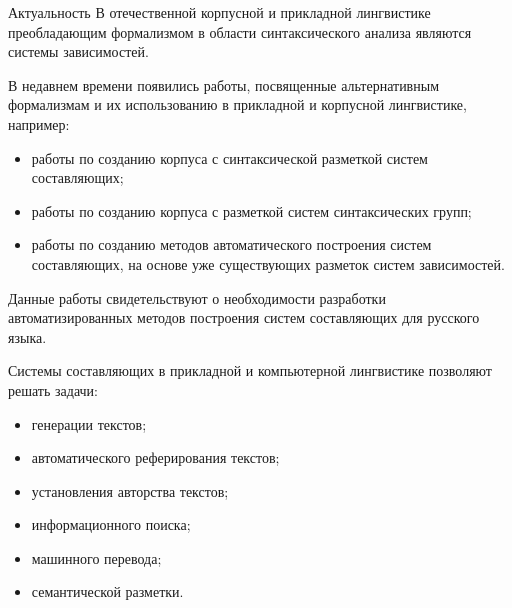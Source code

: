 \documentclass[8pt, aspectratio=169]{beamer}
\begin{document}
	\begin{frame}{\centering Актуальность}
		\setlength{\parindent}{.5cm}
		В отечественной корпусной и прикладной лингвистике преобладающим формализмом в области синтаксического анализа являются системы зависимостей.
		
		В недавнем времени появились работы, посвященные альтернативным формализмам и их использованию в прикладной и корпусной лингвистике, например:
		\begin{itemize}
			\item[---] работы по созданию корпуса с синтаксической разметкой систем составляющих;
			\item[---] работы по созданию корпуса с разметкой систем синтаксических групп;
			\item[---] работы по созданию методов автоматического построения систем составляющих, на основе уже существующих разметок систем зависимостей.
		\end{itemize}
		
		Данные работы свидетельствуют о необходимости разработки автоматизированных методов построения систем составляющих для русского языка.
		
		Системы составляющих в прикладной и компьютерной лингвистике позволяют решать задачи:
		\begin{itemize}
			\item[---] генерации текстов;
			\item[---] автоматического реферирования текстов;
			\item[---] установления авторства текстов;
			\item[---] информационного поиска;
			\item[---] машинного перевода;
			\item[---] семантической разметки.
		\end{itemize}
		
		
	\end{frame}
	
\end{document}
